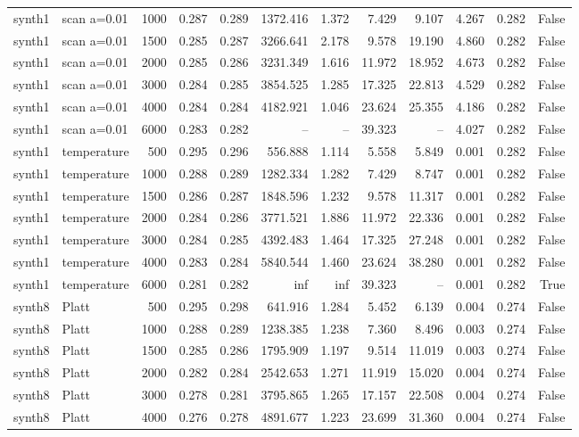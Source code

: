 \begin{tabular}{llrrrrrrrrrr}
synth1 & scan a=0.01 & 1000 & 0.287 & 0.289 & 1372.416 & 1.372 & 7.429 & 9.107 & 4.267 & 0.282 & False \\
synth1 & scan a=0.01 & 1500 & 0.285 & 0.287 & 3266.641 & 2.178 & 9.578 & 19.190 & 4.860 & 0.282 & False \\
synth1 & scan a=0.01 & 2000 & 0.285 & 0.286 & 3231.349 & 1.616 & 11.972 & 18.952 & 4.673 & 0.282 & False \\
synth1 & scan a=0.01 & 3000 & 0.284 & 0.285 & 3854.525 & 1.285 & 17.325 & 22.813 & 4.529 & 0.282 & False \\
synth1 & scan a=0.01 & 4000 & 0.284 & 0.284 & 4182.921 & 1.046 & 23.624 & 25.355 & 4.186 & 0.282 & False \\
synth1 & scan a=0.01 & 6000 & 0.283 & 0.282 & -- & -- & 39.323 & -- & 4.027 & 0.282 & False \\
synth1 & temperature & 500 & 0.295 & 0.296 & 556.888 & 1.114 & 5.558 & 5.849 & 0.001 & 0.282 & False \\
synth1 & temperature & 1000 & 0.288 & 0.289 & 1282.334 & 1.282 & 7.429 & 8.747 & 0.001 & 0.282 & False \\
synth1 & temperature & 1500 & 0.286 & 0.287 & 1848.596 & 1.232 & 9.578 & 11.317 & 0.001 & 0.282 & False \\
synth1 & temperature & 2000 & 0.284 & 0.286 & 3771.521 & 1.886 & 11.972 & 22.336 & 0.001 & 0.282 & False \\
synth1 & temperature & 3000 & 0.284 & 0.285 & 4392.483 & 1.464 & 17.325 & 27.248 & 0.001 & 0.282 & False \\
synth1 & temperature & 4000 & 0.283 & 0.284 & 5840.544 & 1.460 & 23.624 & 38.280 & 0.001 & 0.282 & False \\
synth1 & temperature & 6000 & 0.281 & 0.282 & inf & inf & 39.323 & -- & 0.001 & 0.282 & True \\
synth8 & Platt & 500 & 0.295 & 0.298 & 641.916 & 1.284 & 5.452 & 6.139 & 0.004 & 0.274 & False \\
synth8 & Platt & 1000 & 0.288 & 0.289 & 1238.385 & 1.238 & 7.360 & 8.496 & 0.003 & 0.274 & False \\
synth8 & Platt & 1500 & 0.285 & 0.286 & 1795.909 & 1.197 & 9.514 & 11.019 & 0.003 & 0.274 & False \\
synth8 & Platt & 2000 & 0.282 & 0.284 & 2542.653 & 1.271 & 11.919 & 15.020 & 0.004 & 0.274 & False \\
synth8 & Platt & 3000 & 0.278 & 0.281 & 3795.865 & 1.265 & 17.157 & 22.508 & 0.004 & 0.274 & False \\
synth8 & Platt & 4000 & 0.276 & 0.278 & 4891.677 & 1.223 & 23.699 & 31.360 & 0.004 & 0.274 & False \\

\end{tabular}
